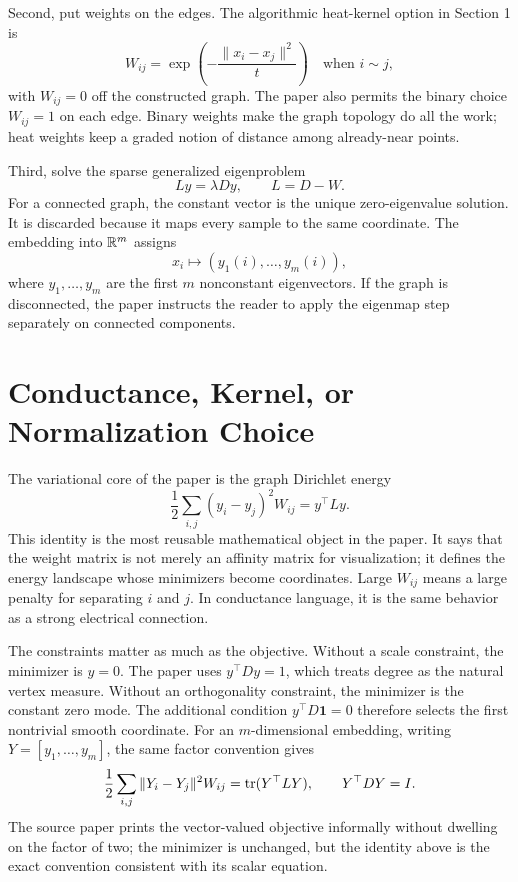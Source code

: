 \documentclass[11pt]{article}
\begin{document}
Second, put weights on the edges. The algorithmic heat-kernel option in
Section 1 is
\[
  W_{ij}=\exp\!\left(-\frac{\|x_i-x_j\|^2}{t}\right)
  \quad\text{when } i\sim j,
\]
with \(W_{ij}=0\) off the constructed graph. The paper also permits the binary
choice \(W_{ij}=1\) on each edge. Binary weights make the graph topology do all
the work; heat weights keep a graded notion of distance among already-near
points.

Third, solve the sparse generalized eigenproblem
\[
  Ly=\lambda D y,\qquad L=D-W.
\]
For a connected graph, the constant vector is the unique zero-eigenvalue
solution. It is discarded because it maps every sample to the same coordinate.
The embedding into \(\mathbb{R}^m\) assigns
\[
  x_i\longmapsto (y_1(i),\ldots,y_m(i)),
\]
where \(y_1,\ldots,y_m\) are the first \(m\) nonconstant eigenvectors. If the
graph is disconnected, the paper instructs the reader to apply the eigenmap
step separately on connected components.

\section{Conductance, Kernel, or Normalization Choice}

The variational core of the paper is the graph Dirichlet energy
\[
  \frac{1}{2}\sum_{i,j}(y_i-y_j)^2 W_{ij}=y^\top L y.
\]
This identity is the most reusable mathematical object in the paper. It says
that the weight matrix is not merely an affinity matrix for visualization; it
defines the energy landscape whose minimizers become coordinates. Large
\(W_{ij}\) means a large penalty for separating \(i\) and \(j\). In conductance
language, it is the same behavior as a strong electrical connection.

The constraints matter as much as the objective. Without a scale constraint,
the minimizer is \(y=0\). The paper uses \(y^\top D y=1\), which treats degree as
the natural vertex measure. Without an orthogonality constraint, the minimizer
is the constant zero mode. The additional condition \(y^\top D\mathbf{1}=0\)
therefore selects the first nontrivial smooth coordinate. For an \(m\)-dimensional
embedding, writing \(Y=[y_1,\ldots,y_m]\), the same factor convention gives
\[
  \frac{1}{2}\sum_{i,j}\|Y_i-Y_j\|^2 W_{ij}
  = \operatorname{tr}(Y^\top L Y),
  \qquad
  Y^\top D Y=I.
\]
The source paper prints the vector-valued objective informally without dwelling
on the factor of two; the minimizer is unchanged, but the identity above is the
exact convention consistent with its scalar equation.
\end{document}
